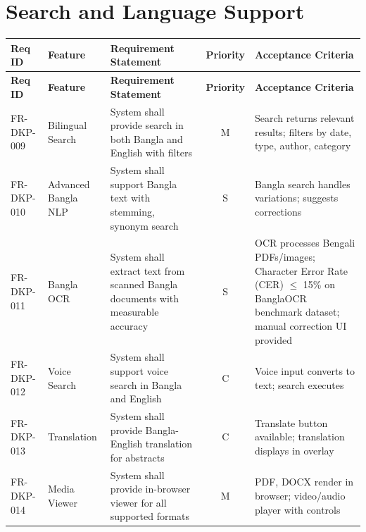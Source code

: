 \documentclass[12pt,a4paper]{report}
\begin{document}
\section{Search and Language Support}
\begin{longtable}{|p{2cm}|p{3cm}|p{5cm}|c|p{3cm}|}
\hline
\textbf{Req ID} & \textbf{Feature} & \textbf{Requirement Statement} & \textbf{Priority} & \textbf{Acceptance Criteria} \\ \hline
\endfirsthead
\hline
\textbf{Req ID} & \textbf{Feature} & \textbf{Requirement Statement} & \textbf{Priority} & \textbf{Acceptance Criteria} \\ \hline
\endhead
FR-DKP-009 & Bilingual Search & System shall provide search in both Bangla and English with filters & M & Search returns relevant results; filters by date, type, author, category \\ \hline
FR-DKP-010 & Advanced Bangla NLP & System shall support Bangla text with stemming, synonym search & S & Bangla search handles variations; suggests corrections \\ \hline
FR-DKP-011 & Bangla OCR & System shall extract text from scanned Bangla documents with measurable accuracy & S & OCR processes Bengali PDFs/images; Character Error Rate (CER) $\leq$ 15\% on BanglaOCR benchmark dataset; manual correction UI provided \\ \hline
FR-DKP-012 & Voice Search & System shall support voice search in Bangla and English & C & Voice input converts to text; search executes \\ \hline
FR-DKP-013 & Translation & System shall provide Bangla-English translation for abstracts & C & Translate button available; translation displays in overlay \\ \hline
FR-DKP-014 & Media Viewer & System shall provide in-browser viewer for all supported formats & M & PDF, DOCX render in browser; video/audio player with controls \\ \hline
\end{longtable}
\end{document}

